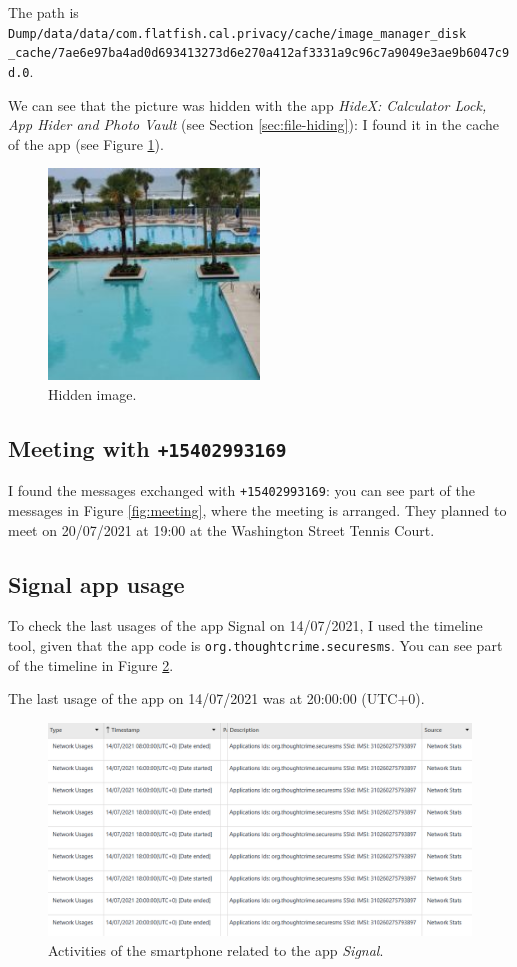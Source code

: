 \documentclass[12pt]{article}
\begin{document}
The path is \texttt{Dump/data/data/com.flatfish.cal.privacy/cache/image\_manager\_disk \\ \_cache/7ae6e97ba4ad0d693413273d6e270a412af3331a9c96c7a9049e3ae9b6047c9d.0}.

We can see that the picture was hidden with the app \textit{HideX: Calculator Lock, App Hider and Photo Vault} (see Section \ref{sec:file-hiding}): I found it in the cache of the app (see Figure \ref{fig:cache}).

\begin{figure}[!ht]
    \centering
    \includegraphics[width=0.5\textwidth]{images/hidden.png}
    \caption{Hidden image.}
    \label{fig:cache}
\end{figure}

\subsection{Meeting with \texttt{+15402993169}}

I found the messages exchanged with \texttt{+15402993169}: you can see part of the messages in Figure \ref{fig:meeting}, where the meeting is arranged. They planned to meet on 20/07/2021 at 19:00 at the Washington Street Tennis Court.

\subsection{Signal app usage}

To check the last usages of the app Signal \cite{signal} on 14/07/2021, I used the timeline tool, given that the app code is \texttt{org.thoughtcrime.securesms}.
You can see part of the timeline in Figure \ref{fig:signal}.

The last usage of the app on 14/07/2021 was at 20:00:00 (UTC+0).

\begin{figure}[!ht]
    \centering
    \includegraphics[width=\textwidth]{images/signal.png}
    \caption{Activities of the smartphone related to the app \textit{Signal}.}
    \label{fig:signal}
\end{figure}

\printbibliography[title={References}]
\end{document}
